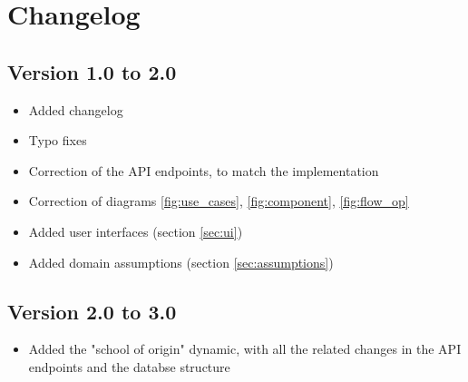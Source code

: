 \chapter{Changelog}
\section{Version 1.0 to 2.0}
\begin{itemize}
    \item Added changelog
    \item Typo fixes
    \item Correction of the API endpoints, to match the implementation
    \item Correction of diagrams \ref{fig:use_cases}, \ref{fig:component}, \ref{fig:flow_op}
    \item Added user interfaces (section \ref{sec:ui})
    \item Added domain assumptions (section \ref{sec:assumptions})
\end{itemize}
\section{Version 2.0 to 3.0}
\begin{itemize}
    \item Added the "school of origin" dynamic, with all the related changes in the API endpoints and the databse structure
\end{itemize}